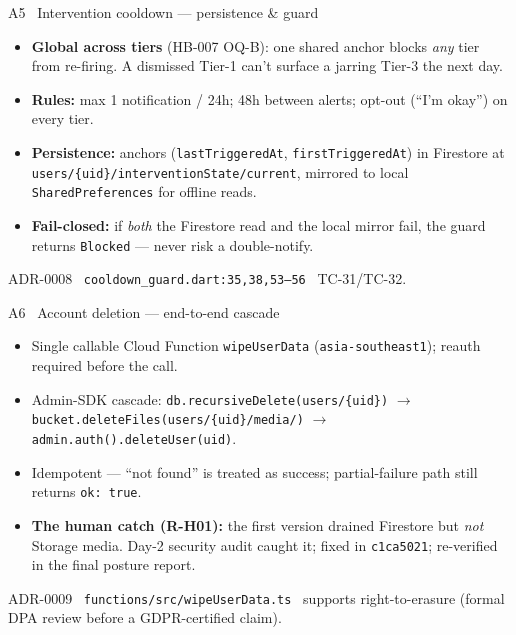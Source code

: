 \documentclass[aspectratio=169,11pt]{beamer}
\begin{document}
\begin{frame}{A5 \textperiodcentered\ Intervention cooldown --- persistence \& guard}
\begin{itemize}\footnotesize
  \item \textbf{Global across tiers} (HB-007 OQ-B): one shared anchor blocks \emph{any} tier from re-firing. A dismissed Tier-1 can't surface a jarring Tier-3 the next day.
  \item \textbf{Rules:} max 1 notification / 24h; 48h between alerts; opt-out (``I'm okay'') on every tier.
  \item \textbf{Persistence:} anchors (\texttt{lastTriggeredAt}, \texttt{firstTriggeredAt}) in Firestore at \texttt{users/\{uid\}/interventionState/current}, mirrored to local \texttt{SharedPreferences} for offline reads.
  \item \textbf{Fail-closed:} if \emph{both} the Firestore read and the local mirror fail, the guard returns \texttt{Blocked} --- never risk a double-notify.
\end{itemize}
\vfill
{\footnotesize\color{gray!70} ADR-0008 \textperiodcentered\ \texttt{cooldown\_guard.dart:35,38,53--56} \textperiodcentered\ TC-31/TC-32.}
\end{frame}

\begin{frame}{A6 \textperiodcentered\ Account deletion --- end-to-end cascade}
\begin{itemize}\footnotesize
  \item Single callable Cloud Function \texttt{wipeUserData} (\texttt{asia-southeast1}); reauth required before the call.
  \item Admin-SDK cascade: \texttt{db.recursiveDelete(users/\{uid\})} $\to$ \texttt{bucket.deleteFiles(users/\{uid\}/media/)} $\to$ \texttt{admin.auth().deleteUser(uid)}.
  \item Idempotent --- ``not found'' is treated as success; partial-failure path still returns \texttt{ok: true}.
  \item \textbf{The human catch (R-H01):} the first version drained Firestore but \emph{not} Storage media. Day-2 security audit caught it; fixed in \texttt{c1ca5021}; re-verified in the final posture report.
\end{itemize}
\vfill
{\footnotesize\color{gray!70} ADR-0009 \textperiodcentered\ \texttt{functions/src/wipeUserData.ts} \textperiodcentered\ supports right-to-erasure (formal DPA review before a GDPR-certified claim).}
\end{frame}
\end{document}
